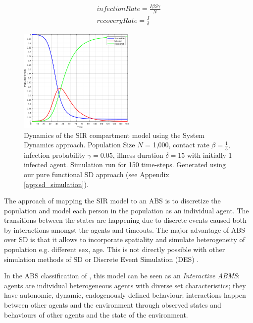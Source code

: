 \begin{equation}
\begin{aligned}
infectionRate = \frac{I \beta S \gamma}{N} \\
recoveryRate = \frac{I}{\delta} 
\end{aligned}
\end{equation}

\begin{figure}
	\centering
	\includegraphics[width=0.5\textwidth, angle=0]{./fig/timedriven/SIR_SD_1000agents_150t_001dt.png}
	\caption{Dynamics of the SIR compartment model using the System Dynamics approach. Population Size $N$ = 1,000, contact rate $\beta =  \frac{1}{5}$, infection probability $\gamma = 0.05$, illness duration $\delta = 15$ with initially 1 infected agent. Simulation run for 150 time-steps. Generated using our pure functional SD approach (see Appendix \ref{app:sd_simulation}).}
	\label{fig:sir_sd_dynamics}
\end{figure}

The approach of mapping the SIR model to an ABS is to discretize the population and model each person in the population as an individual agent. The transitions between the states are happening due to discrete events caused both by interactions amongst the agents and timeouts. The major advantage of ABS over SD is that it allows to incorporate spatiality and simulate heterogeneity of population e.g. different sex, age. This is not directly possible with other simulation methods of SD or Discrete Event Simulation (DES) \cite{zeigler_theory_2000}.

In the ABS classification of \cite{macal_everything_2016}, this model can be seen as an \textit{Interactive ABMS}: agents are individual heterogeneous agents with diverse set characteristics; they have autonomic, dynamic, endogenously defined behaviour; interactions happen between other agents and the environment through observed states and behaviours of other agents and the state of the environment.